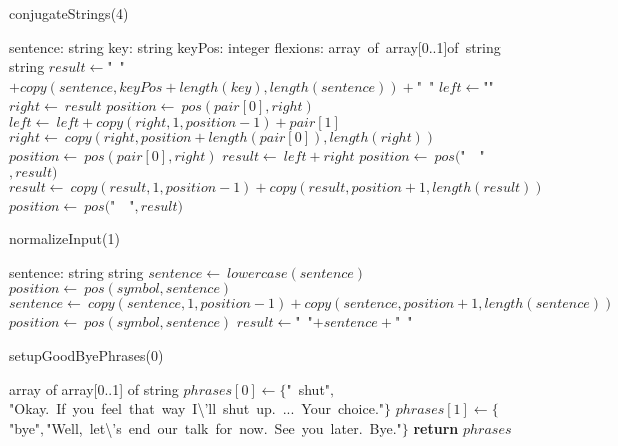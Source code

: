 \documentclass[a4paper,10pt]{article}
\begin{document}
\begin{algorithm}
\caption{conjugateStrings(4)}
\begin{algorithmic}[5]
    \State sentence: string
    \State key: string
    \State keyPos: integer
    \State flexions: array\ of\ array[0..1]of\ string
  \EndDecl
    \State string
  \EndDecl
  \State \(result\gets\)"{}\ "{}\(+copy(sentence,keyPos+length(key),length(sentence))+\)"{}\ "{}\(\)
    \State \(left\gets\)"{}"{}\(\)
    \State \(right\gets\ result\)
    \State \(position\gets\ pos(pair[0],right)\)
      \State \(left\gets\ left+copy(right,1,position-1)+pair[1]\)
      \State \(right\gets\ copy(right,position+length(pair[0]),length(right))\)
      \State \(position\gets\ pos(pair[0],right)\)
    \EndWhile
    \State \(result\gets\ left+right\)
  \EndFor
  \State \(position\gets\ pos(\)"{}\ \ "{}\(,result)\)
    \State \(result\gets\ copy(result,1,position-1)+copy(result,position+1,length(result))\)
    \State \(position\gets\ pos(\)"{}\ \ "{}\(,result)\)
  \EndWhile
\EndFunction
\end{algorithmic}
\end{algorithm}


\begin{algorithm}
\caption{normalizeInput(1)}
\begin{algorithmic}[5]
\State {}
\State {}
\State {}
    \State sentence: string
  \EndDecl
    \State string
  \EndDecl
  \State \(sentence\gets\ lowercase(sentence)\)
    \State \(position\gets\ pos(symbol,sentence)\)
      \State \(sentence\gets\ copy(sentence,1,position-1)+copy(sentence,position+1,length(sentence))\)
      \State \(position\gets\ pos(symbol,sentence)\)
    \EndWhile
  \EndFor
  \State \(result\gets\)"{}\ "{}\(+sentence+\)"{}\ "{}\(\)
\EndFunction
\end{algorithmic}
\end{algorithm}


\begin{algorithm}
\caption{setupGoodByePhrases(0)}
\begin{algorithmic}[5]
    \State array of array[0..1] of string
  \EndDecl
  \State \(phrases[0]\gets\{\)"{}\ shut"{}\(,\)"{}Okay.\ If\ you\ feel\ that\ way\ I\textbackslash{}'{}ll\ shut\ up.\ ...\ Your\ choice."{}\(\}\)
  \State \(phrases[1]\gets\{\)"{}bye"{}\(,\)"{}Well,\ let\textbackslash{}'{}s\ end\ our\ talk\ for\ now.\ See\ you\ later.\ Bye."{}\(\}\)
  \State \textbf{return} \(phrases\)
\EndFunction
\end{algorithmic}
\end{algorithm}
\end{document}
